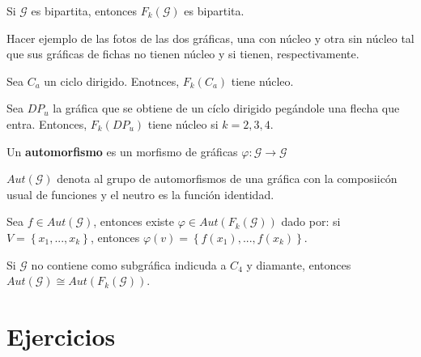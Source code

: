 \documentclass[12pt]{report}
\theoremstyle{largebreak}
\newcommand\cf[3]{\ensuremath{#1:#2\rightarrow#3}}
\begin{document}
    \begin{theor}
        Si $\mathcal{G}$ es bipartita, entonces $F_k(\mathcal{G})$ es bipartita.
    \end{theor}

    \begin{exa}
        Hacer ejemplo de las fotos de las dos gráficas, una con núcleo y otra sin núcleo tal que sus gráficas de fichas no tienen núcleo y si tienen, respectivamente.
    \end{exa}

    \begin{theor}
        Sea $C_a$ un ciclo dirigido. Enotnces, $F_k(C_a)$ tiene núcleo.
    \end{theor}

    Sea $DP_u$ la gráfica que se obtiene de un cíclo dirigido pegándole una flecha que entra. Entonces, $F_k(DP_u)$ tiene núcleo si $k=2,3,4$.

    \begin{mydef}
        Un \textbf{automorfismo} es un morfismo de gráficas $\cf{\varphi}{\mathcal{G}}{\mathcal{G}}$
    \end{mydef}

    \begin{mydef}
        $Aut(\mathcal{G})$ denota al grupo de automorfismos de una gráfica con la composiicón usual de funciones y el neutro es la función identidad.
    \end{mydef}

    Sea $f\in Aut(\mathcal{G})$, entonces existe $\varphi\in Aut(F_k(\mathcal{G}))$ dado por: si $V=\left\{x_1,...,x_k\right\}$, entonces $\varphi(v)=\left\{f(x_1),...,f(x_k)\right\}$.

    \begin{theor}
        Si $\mathcal{G}$ no contiene como subgráfica indicuda a $C_4$ y diamante, entonces $Aut(\mathcal{G})\cong Aut(F_k(\mathcal{G}))$.
    \end{theor}

    

    \chapter{Ejercicios}
\end{document}
